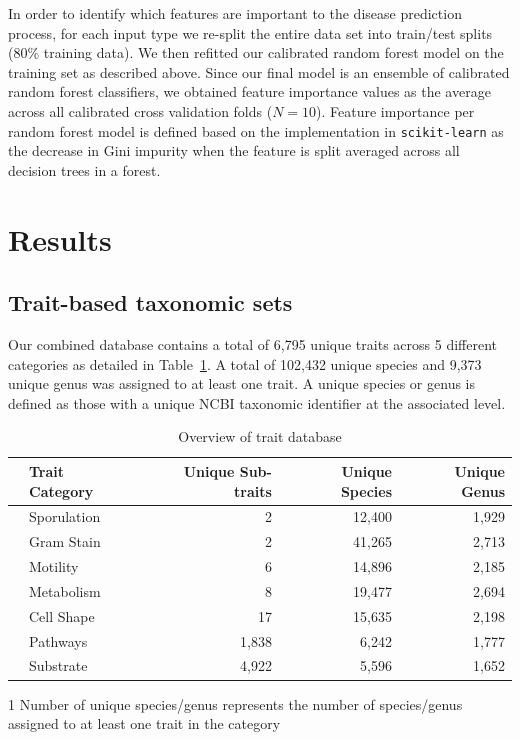 \documentclass{bmcart}
\begin{document}
In order to identify which features are important to the disease prediction process, for each input type we re-split the entire data set into train/test splits (80\% training data). We then refitted our calibrated random forest model on the training set as described above. Since our final model is an ensemble of calibrated random forest classifiers, we obtained feature importance values as the average across all calibrated cross validation folds ($N = 10$). Feature importance per random forest model is defined based on the implementation in \texttt{scikit-learn} as the decrease in Gini impurity when the feature is split averaged across all decision trees in a forest.    

\section*{Results}

\subsection*{Trait-based taxonomic sets}

Our combined database contains a total of 6,795 unique traits across 5 different categories as detailed in Table~\ref{tab:1}. A total of 102,432 unique species and 9,373 unique genus was assigned to at least one trait. A unique species or genus is defined as those with a unique NCBI taxonomic identifier at the associated level.  

\begin{table}[ht]
\centering
\begin{threeparttable}
\caption{Overview of trait database}
\label{tab:1}
\begin{tabular}{rlrrr}
  \hline
 & Trait Category & Unique Sub-traits & Unique Species\tnote{1} & Unique Genus\tnote{1} \\ 
  \hline
& Sporulation &   2 & 12,400 & 1,929 \\ 
& Gram Stain &   2 & 41,265 & 2,713 \\ 
& Motility &   6 & 14,896 & 2,185 \\ 
& Metabolism &   8 & 19,477 & 2,694 \\ 
& Cell Shape &  17 & 15,635 & 2,198 \\ 
& Pathways & 1,838 & 6,242 & 1,777 \\ 
& Substrate & 4,922 & 5,596 & 1,652 \\ 
   \hline
\end{tabular}
\begin{tablenotes}
\item[1]Number of unique species/genus represents the number of species/genus assigned to at least one trait in the category
\end{tablenotes}
\end{threeparttable}
\end{table}
\end{document}
